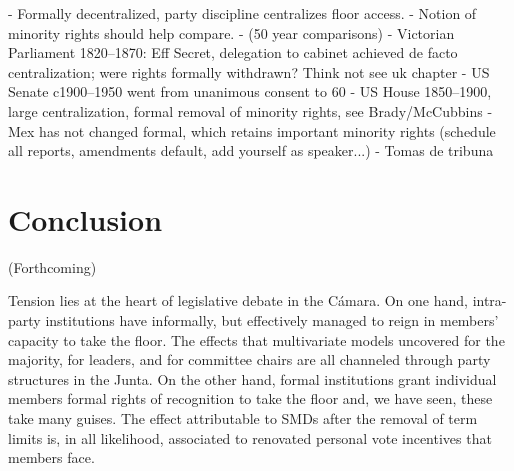 \documentclass[letter,12pt]{article}
\begin{document}
- Formally decentralized, party discipline centralizes floor access.
- Notion of minority rights should help compare.
- (50 year comparisons)
- Victorian Parliament 1820--1870: Eff Secret, delegation to cabinet achieved de facto centralization; were rights formally withdrawn? Think not see uk chapter
- US Senate c1900--1950 went from unanimous consent to 60%
- US House 1850--1900, large centralization, formal removal of minority rights, see Brady/McCubbins
- Mex has not changed formal, which retains important minority rights (schedule all reports, amendments default, add yourself as speaker...)
- Tomas de tribuna








\section{Conclusion} %

(Forthcoming)


Tension lies at the heart of legislative debate in the Cámara. On one hand, intra-party institutions have informally, but effectively managed to reign in members' capacity to take the floor. The effects that multivariate models uncovered for the majority, for leaders, and for committee chairs are all channeled through party structures in the Junta. On the other hand, formal institutions grant individual members formal rights of recognition to take the floor and, we have seen, these take many guises. The effect attributable to SMDs after the removal of term limits is, in all likelihood, associated to renovated personal vote incentives that members face. 
\end{document}
